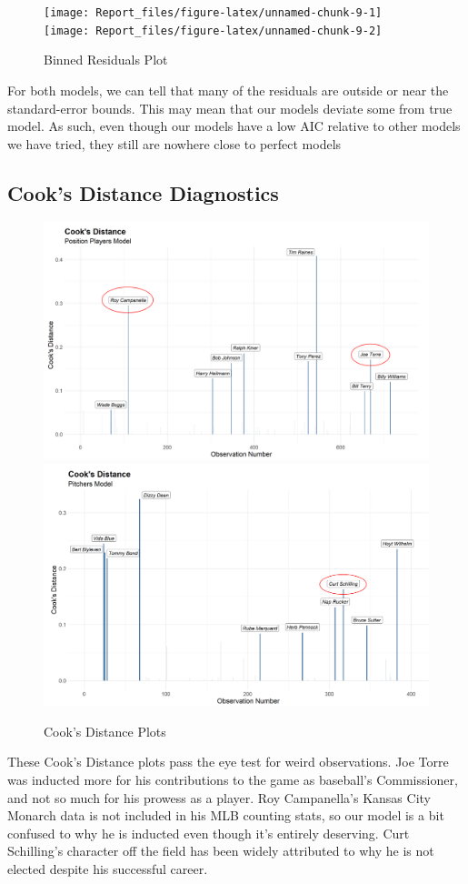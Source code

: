 \documentclass[
]{article}
\begin{document}
\begin{figure}

\texttt{[image: Report\_files/figure-latex/unnamed-chunk-9-1]} \texttt{[image: Report\_files/figure-latex/unnamed-chunk-9-2]} \hfill{}

\caption{Binned Residuals Plot}\label{fig:unnamed-chunk-9}
\end{figure}

For both models, we can tell that many of the residuals are outside or
near the standard-error bounds. This may mean that our models deviate
some from true model. As such, even though our models have a low AIC
relative to other models we have tried, they still are nowhere close to
perfect models

\hypertarget{cooks-distance-diagnostics}{%
\subsection{Cook's Distance
Diagnostics}\label{cooks-distance-diagnostics}}

\begin{figure}

{\centering \includegraphics[width=0.49\linewidth,height=0.2\textheight]{../Plots/pos_cooks} \includegraphics[width=0.49\linewidth,height=0.2\textheight]{../Plots/pitch_cooks} 

}

\caption{Cook's Distance Plots}\label{fig:unnamed-chunk-10}
\end{figure}

These Cook's Distance plots pass the eye test for weird observations.
Joe Torre was inducted more for his contributions to the game as
baseball's Commissioner, and not so much for his prowess as a player.
Roy Campanella's Kansas City Monarch data is not included in his MLB
counting stats, so our model is a bit confused to why he is inducted
even though it's entirely deserving. Curt Schilling's character off the
field has been widely attributed to why he is not elected despite his
successful career.
\end{document}
